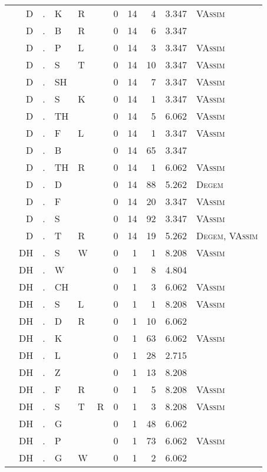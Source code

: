 \begin{longtable}{r@{ } r@{ } c@{ } l@{ } l@{ } l@{ } r r r r l }
 & D & . & K & R &  & 0 & 14 & 4 & 3.347 & \textsc{VAssim} \\
 & D & . & B & R &  & 0 & 14 & 6 & 3.347 &  \\
 & D & . & P & L &  & 0 & 14 & 3 & 3.347 & \textsc{VAssim} \\
 & D & . & S & T &  & 0 & 14 & 10 & 3.347 & \textsc{VAssim} \\
 & D & . & SH &  &  & 0 & 14 & 7 & 3.347 & \textsc{VAssim} \\
 & D & . & S & K &  & 0 & 14 & 1 & 3.347 & \textsc{VAssim} \\
 & D & . & TH &  &  & 0 & 14 & 5 & 6.062 & \textsc{VAssim} \\
 & D & . & F & L &  & 0 & 14 & 1 & 3.347 & \textsc{VAssim} \\
 & D & . & B &  &  & 0 & 14 & 65 & 3.347 &  \\
 & D & . & TH & R &  & 0 & 14 & 1 & 6.062 & \textsc{VAssim} \\
 & D & . & D &  &  & 0 & 14 & 88 & 5.262 & \textsc{Degem} \\
 & D & . & F &  &  & 0 & 14 & 20 & 3.347 & \textsc{VAssim} \\
 & D & . & S &  &  & 0 & 14 & 92 & 3.347 & \textsc{VAssim} \\
 & D & . & T & R &  & 0 & 14 & 19 & 5.262 & \textsc{Degem}, \textsc{VAssim} \\
 & DH & . & S & W &  & 0 & 1 & 1 & 8.208 & \textsc{VAssim} \\
 & DH & . & W &  &  & 0 & 1 & 8 & 4.804 &  \\
 & DH & . & CH &  &  & 0 & 1 & 3 & 6.062 & \textsc{VAssim} \\
 & DH & . & S & L &  & 0 & 1 & 1 & 8.208 & \textsc{VAssim} \\
 & DH & . & D & R &  & 0 & 1 & 10 & 6.062 &  \\
 & DH & . & K &  &  & 0 & 1 & 63 & 6.062 & \textsc{VAssim} \\
 & DH & . & L &  &  & 0 & 1 & 28 & 2.715 &  \\
 & DH & . & Z &  &  & 0 & 1 & 13 & 8.208 &  \\
 & DH & . & F & R &  & 0 & 1 & 5 & 8.208 & \textsc{VAssim} \\
 & DH & . & S & T & R & 0 & 1 & 3 & 8.208 & \textsc{VAssim} \\
 & DH & . & G &  &  & 0 & 1 & 48 & 6.062 &  \\
 & DH & . & P &  &  & 0 & 1 & 73 & 6.062 & \textsc{VAssim} \\
 & DH & . & G & W &  & 0 & 1 & 2 & 6.062 &  \\

\end{longtable}
